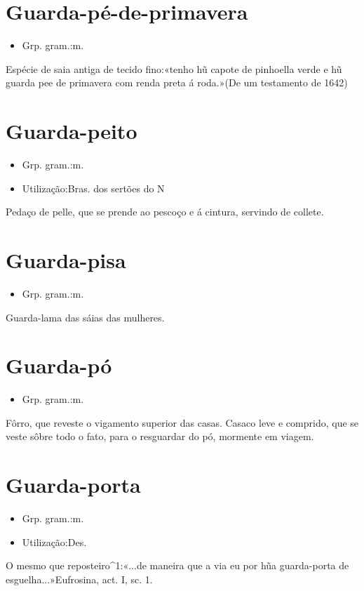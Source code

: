 \section{Guarda-pé-de-primavera}
\begin{itemize}
\item {Grp. gram.:m.}
\end{itemize}
Espécie de saia antiga de tecido fino:«\textunderscore tenho hũ capote de pinhoella verde e hũ guarda pee de primavera com renda preta á roda.\textunderscore »(De um testamento de 1642)
\section{Guarda-peito}
\begin{itemize}
\item {Grp. gram.:m.}
\end{itemize}
\begin{itemize}
\item {Utilização:Bras. dos sertões do N}
\end{itemize}
Pedaço de pelle, que se prende ao pescoço e á cintura, servindo de collete.
\section{Guarda-pisa}
\begin{itemize}
\item {Grp. gram.:m.}
\end{itemize}
Guarda-lama das sáias das mulheres.
\section{Guarda-pó}
\begin{itemize}
\item {Grp. gram.:m.}
\end{itemize}
Fôrro, que reveste o vigamento superior das casas.
Casaco leve e comprido, que se veste sôbre todo o fato, para o resguardar do pó, mormente em viagem.
\section{Guarda-porta}
\begin{itemize}
\item {Grp. gram.:m.}
\end{itemize}
\begin{itemize}
\item {Utilização:Des.}
\end{itemize}
O mesmo que \textunderscore reposteiro\textunderscore ^1:«\textunderscore ...de maneira que a via eu por hũa guarda-porta de esguelha...\textunderscore »\textunderscore Eufrosina\textunderscore , act. I, sc. 1.
